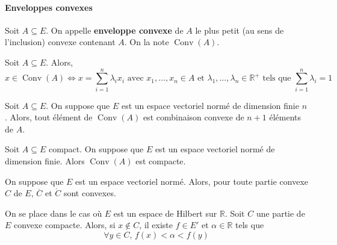   \paragraph{Enveloppes convexes}


  \begin{definition}
    Soit $A \subseteq E$. On appelle \textbf{enveloppe convexe} de $A$ le plus petit (au sens de l'inclusion) convexe contenant $A$. On la note $\operatorname{Conv}(A)$.
  \end{definition}

  \begin{proposition}
    Soit $A \subseteq E$. Alors,
    \[ x \in \operatorname{Conv}(A) \iff x = \sum_{i=1}^{n} \lambda_i x_i \text{ avec } x_1, \dots, x_n \in A \text{ et } \lambda_1, \dots, \lambda_n \in \mathbb{R}^+ \text{ tels que } \sum_{i=1}^n \lambda_i = 1 \]
  \end{proposition}


  \begin{theorem}
    Soit $A \subseteq E$. On suppose que $E$ est un espace vectoriel normé de dimension finie $n$. Alors, tout élément de $\operatorname{Conv}(A)$ est combinaison convexe de $n+1$ éléments de $A$.
  \end{theorem}

  \begin{application}
    Soit $A \subseteq E$ compact. On suppose que $E$ est un espace vectoriel normé de dimension finie. Alors $\operatorname{Conv}(A)$ est compacte.
  \end{application}

  \begin{proposition}
    On suppose que $E$ est un espace vectoriel normé. Alors, pour toute partie convexe $C$ de $E$, $\overline{C}$ et $\mathring{C}$ sont convexes.
  \end{proposition}


  \begin{theorem}
    On se place dans le cas où $E$ est un espace de Hilbert sur $\mathbb{R}$. Soit $C$ une partie de $E$ convexe compacte. Alors, si $x \notin C$, il existe $f \in E'$ et $\alpha \in \mathbb{R}$ tels que
    \[ \forall y \in C, \, f(x) < \alpha < f(y) \]
  \end{theorem}


